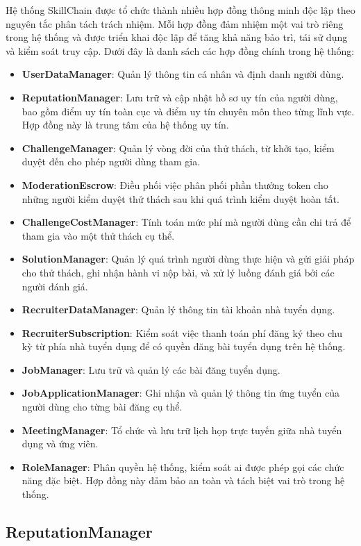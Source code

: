 Hệ thống SkillChain được tổ chức thành nhiều hợp đồng thông minh độc lập theo nguyên tắc phân tách trách nhiệm. Mỗi hợp đồng đảm nhiệm một vai trò riêng trong hệ thống và được triển khai độc lập để tăng khả năng bảo trì, tái sử dụng và kiểm soát truy cập. Dưới đây là danh sách các hợp đồng chính trong hệ thống:

\begin{itemize}
  \item \textbf{UserDataManager}: Quản lý thông tin cá nhân và định danh người dùng.
  \item \textbf{ReputationManager}: Lưu trữ và cập nhật hồ sơ uy tín của người dùng, bao gồm điểm uy tín toàn cục và điểm uy tín chuyên môn theo từng lĩnh vực. Hợp đồng này là trung tâm của hệ thống uy tín.
  \item \textbf{ChallengeManager}: Quản lý vòng đời của thử thách, từ khởi tạo, kiểm duyệt đến cho phép người dùng tham gia.
  \item \textbf{ModerationEscrow}: Điều phối việc phân phối phần thưởng token cho những người kiểm duyệt thử thách sau khi quá trình kiểm duyệt hoàn tất.
  \item \textbf{ChallengeCostManager}: Tính toán mức phí mà người dùng cần chi trả để tham gia vào một thử thách cụ thể.
  \item \textbf{SolutionManager}: Quản lý quá trình người dùng thực hiện và gửi giải pháp cho thử thách, ghi nhận hành vi nộp bài, và xử lý luồng đánh giá bởi các người đánh giá.
  \item \textbf{RecruiterDataManager}: Quản lý thông tin tài khoản nhà tuyển dụng.
  \item \textbf{RecruiterSubscription}: Kiểm soát việc thanh toán phí đăng ký theo chu kỳ từ phía nhà tuyển dụng để có quyền đăng bài tuyển dụng trên hệ thống.
  \item \textbf{JobManager}: Lưu trữ và quản lý các bài đăng tuyển dụng.
  \item \textbf{JobApplicationManager}: Ghi nhận và quản lý thông tin ứng tuyển của người dùng cho từng bài đăng cụ thể.
  \item \textbf{MeetingManager}: Tổ chức và lưu trữ lịch họp trực tuyến giữa nhà tuyển dụng và ứng viên.
  \item \textbf{RoleManager}: Phân quyền hệ thống, kiểm soát ai được phép gọi các chức năng đặc biệt. Hợp đồng này đảm bảo an toàn và tách biệt vai trò trong hệ thống.
\end{itemize}

\subsection{ReputationManager}

